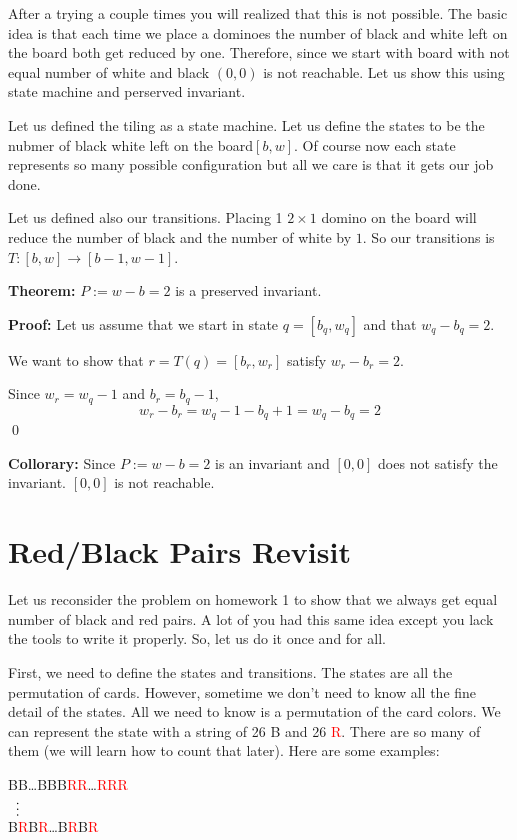 \documentclass[a4paper, 12pt]{article}
\newcommand{\theorem}{\vspace{1em}\noindent\textbf{Theorem:} }
\renewcommand{\proof}{\vspace{0.5em}\noindent\textbf{Proof:} }
\newcommand{\collorary}{\vspace{1em}\noindent\textbf{Collorary:} }
\newcommand{\qedd}{\qed\newline}
\newcommand{\R}{\textcolor{red}{R}}
\theoremstyle{examplestyle}
\begin{document}
\begin{multicols}{2}
\begin{center}
	
\end{center}

After a trying a couple times you will realized that this is not possible. The basic idea is that each time we place a dominoes the number of black and white left on the board both get reduced by one. Therefore, since we start with board with not equal number of white and black $(0,0)$ is not reachable. Let us show this using state machine and perserved invariant.

Let us defined the tiling as a state machine. Let us define the states to be the nubmer of black white left on the board$[b,w]$. Of course now each state represents so many possible configuration but all we care is that it gets our job done.

Let us defined also our transitions. Placing 1 $2\times1$ domino on the board will reduce the number of black and the number of white by $1$. So our transitions is $T:[b,w] \to [b-1, w-1]$.

\theorem $P:= w-b = 2$ is a preserved invariant.

\proof Let us assume that we start in state $q = [b_q, w_q]$ and that $ w_q - b_q = 2$.

We want to show that $r = T(q) = [b_r, w_r]$ satisfy $w_r - b_r = 2$.

Since $w_r = w_q -1$ and $b_r=b_q -1$,
\[
	w_r - b_r = w_q -1 - b_q +1 = w_q-b_q = 2
\]
\qedd

\collorary Since $P:=w-b=2$ is an invariant and $[0,0]$ does not satisfy the invariant. $[0,0]$ is not reachable.



\section*{Red/Black Pairs Revisit}
Let us reconsider the problem on homework 1 to show that we always get equal number of black and red pairs. A lot of you had this same idea except you lack the tools to write it properly. So, let us do it once and for all.

First, we need to define the states and transitions. The states are all the permutation of cards. However, sometime we don't need to know all the fine detail of the states. All we need to know is a permutation of the card colors. We can represent the state with a string of 26 B and 26 \R. There are so many of them (we will learn how to count that later). Here are some examples:
\begin{center}
	BB\ldots BBB\R\R \ldots \R\R\R\\
	 $\vdotswithin{=}$\\
	B\R B\R\ldots B\R B\R
\end{center}


\end{multicols}
\end{document}

